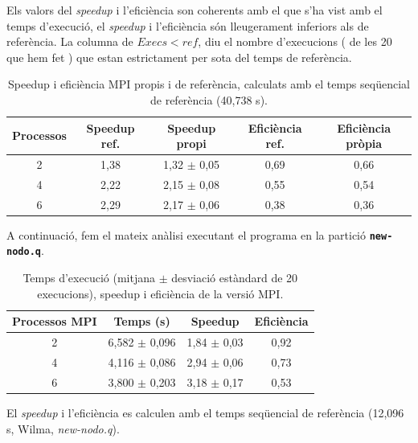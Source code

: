 \documentclass{article}
\begin{document}
Els valors del \textit{speedup} i l'eficiència son coherents amb el que s'ha vist amb el temps d'execució, el \textit{speedup} i l'eficiència són lleugerament inferiors als de referència. La columna de $Execs < ref$, diu el nombre d'execucions ( de les 20 que hem fet ) que estan estrictament per sota del temps de referència.

\begin{table}[H]
\centering
\begin{tabular}{|c|c|c|c|c|}
\hline
\textbf{Processos} & \textbf{Speedup ref.} & \textbf{Speedup propi} & \textbf{Eficiència ref.} & \textbf{Eficiència pròpia} \\ \hline
2 & 1,38 & 1,32 $\pm$ 0,05 & 0,69 & 0,66 \\ \hline
4 & 2,22 & 2,15 $\pm$ 0,08 & 0,55 & 0,54 \\ \hline
6 & 2,29 & 2,17 $\pm$ 0,06 & 0,38 & 0,36 \\ \hline
\end{tabular}
\caption{Speedup i eficiència MPI propis i de referència, calculats amb el temps seqüencial de referència (40,738 s).}
\label{tab:mpi_comp_speedup}
\end{table}

A continuació, fem el mateix anàlisi executant el programa en la partició \texttt{\textbf{new-nodo.q}}.

\begin{table}[H]
\centering
\begin{tabular}{|c|c|c|c|}
\hline
\textbf{Processos MPI} & \textbf{Temps (s)} & \textbf{Speedup} & \textbf{Eficiència} \\ \hline
2 & 6,582 $\pm$ 0,096 & 1,84 $\pm$ 0,03 & 0,92 \\ \hline
4 & 4,116 $\pm$ 0,086 & 2,94 $\pm$ 0,06 & 0,73 \\ \hline
6 & 3,800 $\pm$ 0,203 & 3,18 $\pm$ 0,17 & 0,53 \\ \hline
\end{tabular}
\caption{Temps d'execució (mitjana $\pm$ desviació estàndard de 20 execucions), speedup i eficiència de la versió MPI.}
\label{tab:mpi_resultats}
\end{table}

El \textit{speedup} i l'eficiència es calculen amb el temps seqüencial de referència (12,096 s, Wilma, \textit{new-nodo.q}).
\end{document}
